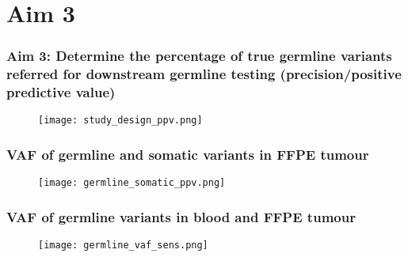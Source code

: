 \documentclass{beamer}
\begin{document}
\section{Aim 3}
\begin{frame}
\frametitle{Aim 3: Determine the percentage of true germline variants referred for downstream germline testing (precision/positive predictive value)}
\begin{figure}[t]
    \texttt{[image: study\_design\_ppv.png]}
\end{figure}
\end{frame}

\begin{frame}
\frametitle{VAF of germline and somatic variants in FFPE tumour}
\begin{figure}[t]
    \texttt{[image: germline\_somatic\_ppv.png]}
\end{figure}
\end{frame}

\begin{frame}
\frametitle{VAF of germline variants in blood and FFPE tumour}
\begin{figure}[t]
    \texttt{[image: germline\_vaf\_sens.png]}
\end{figure}
\end{frame}
\end{document}
